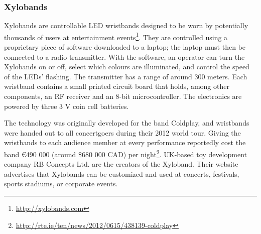 \subsubsection{Xylobands}

Xylobands are controllable LED wristbands designed to be worn by potentially thousands of users at entertainment events\footnote{\url{http://xylobands.com}}. They are controlled using a proprietary piece of software downloaded to a laptop; the laptop must then be connected to a radio transmitter. With the software, an operator can turn the Xylobands on or off, select which colours are illuminated, and control the speed of the LEDs' flashing. The transmitter has a range of around 300 meters. Each wristband contains a small printed circuit board that holds, among other components, an RF receiver and an 8-bit microcontroller. The electronics are powered by three 3 V coin cell batteries.

The technology was originally developed for the band Coldplay, and wristbands were handed out to all concertgoers during their 2012 world tour. Giving the wristbands to each audience member at every performance reportedly cost the band \euro{}490 000 (around \$680 000 CAD) per night\footnote{\url{http://rte.ie/ten/news/2012/0615/438139-coldplay}}. UK-based toy development company RB Concepts Ltd. are the creators of the Xyloband. Their website advertises that Xylobands can be customized and used at concerts, festivals, sports stadiums, or corporate events.
